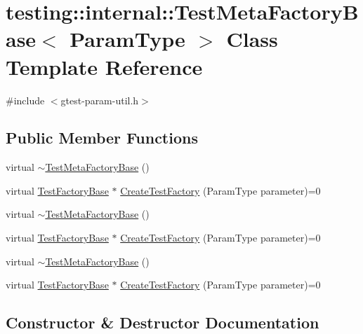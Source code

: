 \hypertarget{classtesting_1_1internal_1_1_test_meta_factory_base}{}\section{testing\+::internal\+::Test\+Meta\+Factory\+Base$<$ Param\+Type $>$ Class Template Reference}
\label{classtesting_1_1internal_1_1_test_meta_factory_base}


{\ttfamily \#include $<$gtest-\/param-\/util.\+h$>$}

\subsection*{Public Member Functions}
\begin{DoxyCompactItemize}
\item 
virtual \mbox{\hyperlink{classtesting_1_1internal_1_1_test_meta_factory_base_aad80adf04686f7dfcf952e44afc02767}{$\sim$\+Test\+Meta\+Factory\+Base}} ()
\item 
virtual \mbox{\hyperlink{classtesting_1_1internal_1_1_test_factory_base}{Test\+Factory\+Base}} $\ast$ \mbox{\hyperlink{classtesting_1_1internal_1_1_test_meta_factory_base_a853daab362740bcac55e180128d564ef}{Create\+Test\+Factory}} (Param\+Type parameter)=0
\item 
virtual \mbox{\hyperlink{classtesting_1_1internal_1_1_test_meta_factory_base_aad80adf04686f7dfcf952e44afc02767}{$\sim$\+Test\+Meta\+Factory\+Base}} ()
\item 
virtual \mbox{\hyperlink{classtesting_1_1internal_1_1_test_factory_base}{Test\+Factory\+Base}} $\ast$ \mbox{\hyperlink{classtesting_1_1internal_1_1_test_meta_factory_base_a853daab362740bcac55e180128d564ef}{Create\+Test\+Factory}} (Param\+Type parameter)=0
\item 
virtual \mbox{\hyperlink{classtesting_1_1internal_1_1_test_meta_factory_base_aad80adf04686f7dfcf952e44afc02767}{$\sim$\+Test\+Meta\+Factory\+Base}} ()
\item 
virtual \mbox{\hyperlink{classtesting_1_1internal_1_1_test_factory_base}{Test\+Factory\+Base}} $\ast$ \mbox{\hyperlink{classtesting_1_1internal_1_1_test_meta_factory_base_a853daab362740bcac55e180128d564ef}{Create\+Test\+Factory}} (Param\+Type parameter)=0
\end{DoxyCompactItemize}


\subsection{Constructor \& Destructor Documentation}
\mbox{\label{classtesting_1_1internal_1_1_test_meta_factory_base_aad80adf04686f7dfcf952e44afc02767}} 
